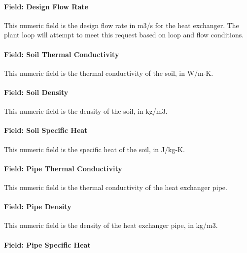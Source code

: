 \paragraph{Field: Design Flow Rate}\label{field-design-flow-rate-1-000}

This numeric field is the design flow rate in m3/s for the heat exchanger. The plant loop will attempt to meet this request based on loop and flow conditions.

\paragraph{Field: Soil Thermal Conductivity}\label{field-soil-thermal-conductivity}

This numeric field is the thermal conductivity of the soil, in W/m-K.

\paragraph{Field: Soil Density}\label{field-soil-density}

This numeric field is the density of the soil, in kg/m3.

\paragraph{Field: Soil Specific Heat}\label{field-soil-specific-heat}

This numeric field is the specific heat of the soil, in J/kg-K.

\paragraph{Field: Pipe Thermal Conductivity}\label{field-pipe-thermal-conductivity-1}

This numeric field is the thermal conductivity of the heat exchanger pipe.

\paragraph{Field: Pipe Density}\label{field-pipe-density}

This numeric field is the density of the heat exchanger pipe, in kg/m3.

\paragraph{Field: Pipe Specific Heat}\label{field-pipe-specific-heat}

